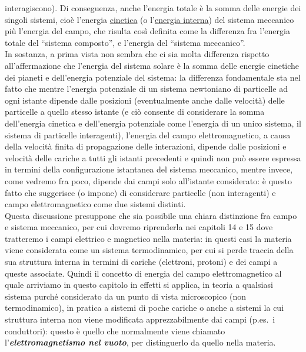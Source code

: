 interagiscono). Di conseguenza, anche l'energia totale \`e la somma delle
energie dei singoli sistemi, cio\`e l'energia \underline{cinetica} (o
l'\underline{energia interna}) del sistema meccanico pi\`u l'energia del campo,
che risulta cos\`i definita come la differenza fra l'energia totale del
``sistema composto'', e l'energia del ``sistema meccanico''.\\
In sostanza, a prima vista non sembra che ci sia molta differenza rispetto
all'affermazione che l'energia del sistema solare \`e la somma delle energie
cinetiche dei pianeti e dell'energia potenziale del sistema: la differenza
fondamentale sta nel fatto che mentre l'energia potenziale di un sistema
newtoniano di particelle ad ogni istante dipende dalle posizioni (eventualmente
anche dalle velocit\`a) delle particelle a quello stesso istante (e ci\`o
consente di considerare la somma dell'energia cinetica e dell'energia potenziale
come l'energia di un unico sistema, il sistema di particelle interagenti),
l'energia del campo elettromagnetico, a causa della velocit\`a finita di
propagazione delle interazioni, dipende dalle posizioni e velocit\`a delle
cariche a tutti gli istanti precedenti e quindi non pu\`o essere espressa in
termini della configurazione istantanea del sistema meccanico, mentre invece,
come vedremo fra poco, dipende dai campi solo all'istante considerato: \`e
questo fatto che suggerisce (o impone) di considerare particelle (non
interagenti) e campo
elettromagnetico come due sistemi distinti.\\
Questa discussione presuppone che sia possibile una chiara distinzione fra campo
e sistema meccanico, per cui dovremo riprenderla nei capitoli 14 e 15 dove
tratteremo i campi elettrico e magnetico nella materia: in questi casi la
materia viene considerata come un sistema termodinamico, per cui si perde
traccia della sua struttura interna in termini di cariche (elettroni, protoni) e
dei campi a queste associate. Quindi il concetto di energia del campo
elettromagnetico al quale arriviamo in questo capitolo in effetti si applica, in
teoria a qualsiasi sistema purch\'e considerato da un punto di vista
microscopico (non termodinamico), in pratica a sistemi di poche cariche o anche
a sistemi la cui struttura interna non viene modificata apprezzabilmente dai
campi (p.es.\ i conduttori): questo \`e quello che normalmente viene chiamato
l'\textbf{\textit{elettromagnetismo nel vuoto}}, per distinguerlo da quello
nella materia.

